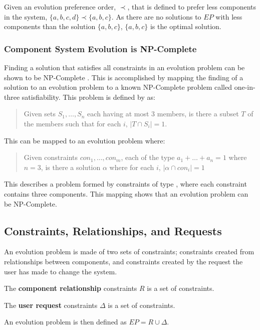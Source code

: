 Given an evolution preference order, $\prec$, that is defined to prefer less components in the system, $\{a,b,c,d\} \prec \{a,b,c\}$.
As there are no solutions to $EP$ with less components than the solution $\{a,b,c\}$, $\{a,b,c\}$ is the optimal solution.

\subsubsection{Component System Evolution is NP-Complete}
Finding a solution that satisfies all constraints in an evolution problem can be shown to be NP-Complete \citep{cook1971}.
This is accomplished by mapping the finding of a solution to an evolution problem to a known NP-Complete problem called one-in-three satisfiability.
This problem is defined by \cite{Schaefer1978} as:
\begin{quote}
Given sets $S_1, \ldots, S_n$ each having at most 3 members, is there a subset $T$ of the members such that for each $i$, $|T \cap S_i|  =  1$.
\end{quote}

This can be mapped to an evolution problem where:
\begin{quote}
Given constraints $con_1,\ldots,con_m$, each of the type  $a_1 + \ldots + a_n = 1$ where $n = 3$, is there a solution $\alpha$ where for each $i$, $|\alpha \cap con_i|  =  1$
\end{quote}
This describes a problem formed by constraints of type \label{formal.upgradeconstraint}, where each constraint contains three components.
This mapping shows that an evolution problem can be NP-Complete.

\subsection{Constraints, Relationships, and Requests}
\label{formal.constraints}
An evolution problem is made of two sets of constraints; constraints created from relationships between components, 
and constraints created by the request the user has made to change the system.

\begin{defs}
The \textbf{component relationship} constraints $R$ is a set of constraints.
\end{defs}

\begin{defs}
The \textbf{user request} constraints $\Delta$ is a set of constraints.
\end{defs}
An evolution problem is then defined as $EP = R \cup \Delta$.

